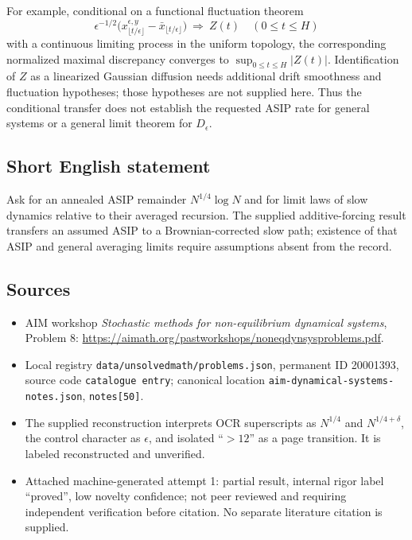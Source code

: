 \documentclass[11pt]{article}
\begin{document}
For example, conditional on a functional fluctuation theorem
\[
 \epsilon^{-1/2}\bigl(x_{\lfloor t/\epsilon\rfloor}^{\epsilon,y}-\bar x_{\lfloor t/\epsilon\rfloor}\bigr)
 \ \Longrightarrow\ Z(t)\quad(0\le t\le H)
\]
with a continuous limiting process in the uniform topology, the corresponding normalized maximal discrepancy converges to \(\sup_{0\le t\le H}|Z(t)|\). Identification of \(Z\) as a linearized Gaussian diffusion needs additional drift smoothness and fluctuation hypotheses; those hypotheses are not supplied here. Thus the conditional transfer does not establish the requested ASIP rate for general systems or a general limit theorem for \(D_\epsilon\).
\subsection{Short English statement}
Ask for an annealed ASIP remainder \(N^{1/4}\log N\) and for limit laws of slow dynamics relative to their averaged recursion. The supplied additive-forcing result transfers an assumed ASIP to a Brownian-corrected slow path; existence of that ASIP and general averaging limits require assumptions absent from the record.
\subsection{Sources}
\begin{itemize}
\item AIM workshop \emph{Stochastic methods for non-equilibrium dynamical systems}, Problem 8: \url{https://aimath.org/pastworkshops/noneqdynsysproblems.pdf}.
\item Local registry \texttt{data/unsolvedmath/problems.json}, permanent ID 20001393, source code \texttt{catalogue entry}; canonical location \texttt{aim-dynamical-systems-notes.json}, \texttt{notes[50]}.
\item The supplied reconstruction interprets OCR superscripts as \(N^{1/4}\) and \(N^{1/4+\delta}\), the control character as \(\epsilon\), and isolated ``\(>12\)'' as a page transition. It is labeled reconstructed and unverified.
\item Attached machine-generated attempt 1: partial result, internal rigor label ``proved'', low novelty confidence; not peer reviewed and requiring independent verification before citation. No separate literature citation is supplied.
\end{itemize}
\end{document}
